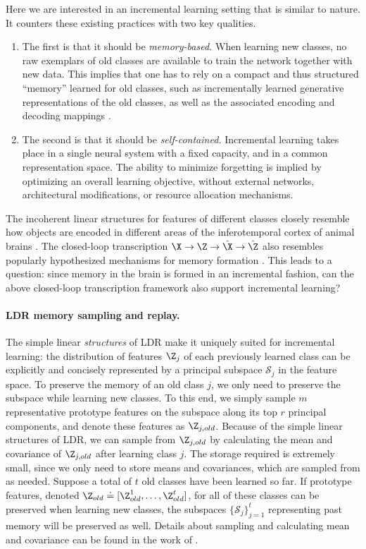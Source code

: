\documentclass[../../book-main.tex]{subfiles}
\begin{document}
Here we are interested in an incremental learning setting that is similar to nature. It counters these existing practices with two key qualities. 
\begin{enumerate}
    \item The first is that it should be \emph{memory-based.} When learning new classes, no raw exemplars of old classes are available to train the network together with new data. This implies that one has to rely on a compact and thus structured ``memory'' learned for old classes, such as incrementally learned generative representations of the old classes, as well as the associated encoding and decoding mappings \cite{fearnet}. 
    \item The second is that it should be \emph{self-contained.} Incremental learning takes place in a single neural system with a fixed capacity, and in a common representation space. The ability to minimize forgetting is implied by optimizing an overall learning objective, without external networks, architectural modifications, or resource allocation mechanisms.
\end{enumerate}

The incoherent linear structures for features of different classes closely resemble how objects are encoded in different areas of the inferotemporal cortex of animal brains \cite{Chang-Cell-2017,Bao2020AMO}. The closed-loop transcription $\X \rightarrow \Z \rightarrow \hat{\X} \rightarrow \hat{\Z}$ also resembles popularly hypothesized mechanisms for memory formation \cite{2020Vandeven,Josselyn2020MemoryER}. This leads to a question: since memory in the brain is formed in an incremental fashion, can the above closed-loop transcription framework also support incremental learning?

\paragraph{LDR memory sampling and replay.} The simple linear {\em structures} of LDR make it uniquely suited for incremental learning: the distribution of features $\Z_j$ of each previously learned class can be explicitly and concisely represented by a principal subspace $\mathcal{S}_j$ in the feature space. To preserve the memory of an old class $j$, we only need to preserve the subspace while learning new classes. To this end, we simply sample $m$ representative prototype features on the subspace along its top $r$ principal components, and denote these features as $\Z_{j,old}$. Because of the simple linear structures of LDR, we can sample from $\Z_{j,old}$ by calculating the mean and covariance of $\Z_{j,old}$ after learning class $j$. The storage required is extremely small, since we only need to store means and covariances, which are sampled from as needed. Suppose a total of $t$ old classes have been learned so far. If prototype features, denoted $\Z_{old} \doteq [\Z^1_{old},\ldots, \Z^t_{old}]$, for all of these classes can be preserved when learning new classes, the subspaces $\{\mathcal{S}_j\}_{j=1}^t$ representing past memory will be preserved as well. Details about sampling and calculating mean and covariance can be found in the work of \cite{tong2023incremental}.
\end{document}
